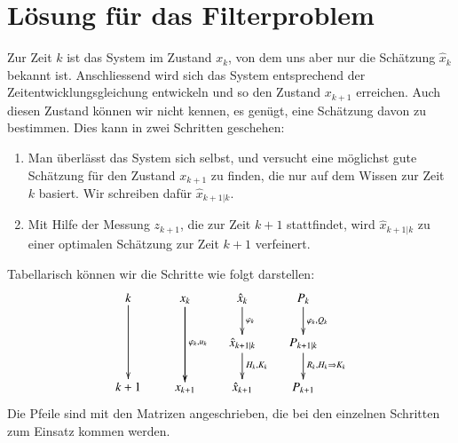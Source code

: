 %
%
%

\section{Lösung für das Filterproblem}
Zur Zeit $k$ ist das System im Zustand $x_k$, von dem uns aber nur die
Schätzung $\hat x_k$ bekannt ist.
Anschliessend wird sich
das System entsprechend der Zeitentwicklungsgleichung entwickeln und
so den Zustand $x_{k+1}$ erreichen.
Auch diesen Zustand können wir nicht
kennen, es genügt, eine Schätzung davon zu bestimmen.
Dies kann in zwei
Schritten geschehen:
\begin{enumerate}
\item Man überlässt das System sich selbst, und versucht eine möglichst
gute Schätzung für den Zustand $x_{k+1}$ zu finden, die nur auf dem
Wissen zur Zeit $k$ basiert.
Wir schreiben dafür $\hat x_{k+1|k}$.
\item Mit Hilfe der Messung $z_{k+1}$, die zur Zeit $k+1$ stattfindet, wird
$\hat x_{k+1|k}$ zu einer optimalen Schätzung zur Zeit $k+1$ verfeinert.
\end{enumerate}
Tabellarisch können wir die Schritte wie folgt darstellen:
\[
\xymatrix @-1mm {
k\ar[dd]&x_k\ar[dd]\ar[dd]^{\varphi_k, u_k} &\hat x_k\ar[d]^{\varphi_k}      &P_{k} \ar[d]^{\varphi_k,Q_k}    \\
        &           &\hat x_{k+1|k}\ar[d]^{H_k,K_k}&P_{k+1|k}\ar[d]^{R_k,H_k\Rightarrow K_k} \\
k+1     &x_{k+1}    &\hat x_{k+1}  &P_{k+1}
} \]
Die Pfeile sind mit den Matrizen angeschrieben, die bei den einzelnen Schritten zum
Einsatz kommen werden.

